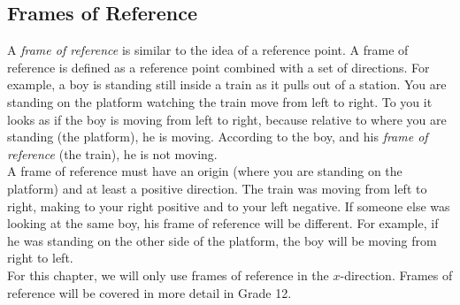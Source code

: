 \subsection{Frames of Reference}
A \textit{frame of reference} is similar to the idea of a reference point. A frame of reference is defined as a reference point combined with a set of directions. For example, a boy is standing still inside a train as it pulls out of a station. You are standing on the platform watching the train move from left to right. To you it looks as if the boy is moving from left to right, because relative to where you are standing (the platform), he is moving. According to the boy, and his \textit{frame of reference} (the train), he is not moving.\\

A frame of reference must have an origin (where you are standing on the platform) and at least a positive direction. The train was moving from left to right, making to your right positive and to your left negative. If someone else was looking at the same boy, his frame of reference will be different. For example, if he was standing on the other side of the platform, the boy will be moving from right to left.\\

For this chapter, we will only use frames of reference in the $x$-direction.
Frames of reference will be covered in more detail in Grade 12.

